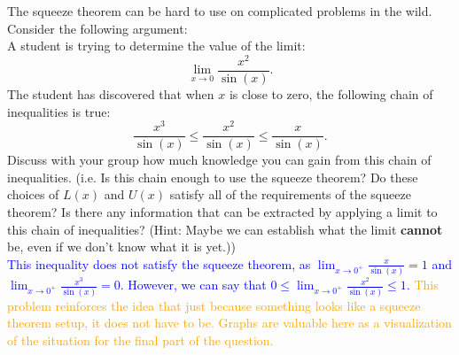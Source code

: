 \documentclass{ximera}
\begin{document}
\begin{exercise}
    The squeeze theorem can be hard to use on complicated problems in the wild.  Consider the following argument: \\
    A student is trying to determine the value of the limit: $$\lim_{x\rightarrow 0}\frac{x^2}{\sin(x)}.$$
    The student has discovered that when $x$ is close to zero, the following chain of inequalities is true: 
    $$\frac{x^3}{\sin(x)}\leq\frac{x^2}{\sin(x)}\leq\frac{x}{\sin(x)}.$$
    Discuss with your group how much knowledge you can gain from this chain of inequalities. (i.e. Is this chain enough to use the squeeze theorem?  Do these choices of $L(x)$ and $U(x)$ satisfy all of the requirements of the squeeze theorem?  Is there any information that can be extracted by applying a limit to this chain of inequalities? (Hint: Maybe we can establish what the limit \textbf{cannot} be, even if we don't know what it is yet.))\\
    \textcolor{blue}{This inequality does not satisfy the squeeze theorem, as $\lim_{x\rightarrow 0^+}\frac{x}{\sin(x)}=1$ and $\lim_{x\rightarrow 0^+}\frac{x^3}{\sin(x)}=0$. However, we can say that $0\leq \lim_{x\rightarrow 0^+}\frac{x^2}{\sin(x)}\leq 1$.}
    \textcolor{orange}{This problem reinforces the idea that just because something looks like a squeeze theorem setup, it does not have to be.  Graphs are valuable here as a visualization of the situation for the final part of the question.}
     
\end{exercise}
\end{document}
